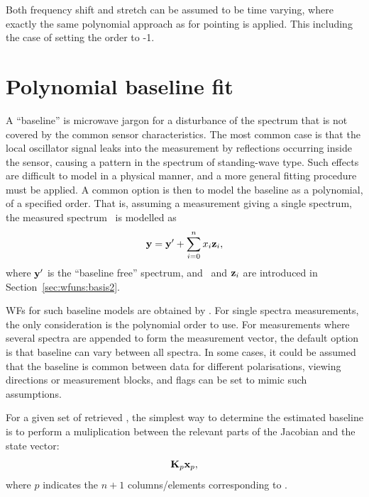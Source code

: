 Both frequency shift and stretch can be assumed to be time varying, where
exactly the same polynomial approach as for pointing is applied. This
including the case of setting the order to -1.




\section{Polynomial baseline fit}
\label{sec:wfuns:polyfit}

A ``baseline'' is microwave jargon for a disturbance of the spectrum that is
not covered by the common sensor characteristics. The most common case is that
the local oscillator signal leaks into the measurement by reflections occurring
inside the sensor, causing a pattern in the spectrum of standing-wave type.
Such effects are difficult to model in a physical manner, and a more general
fitting procedure must be applied. A common option is then to model the
baseline as a polynomial, of a specified order. That is, assuming a measurement
giving a single spectrum, the measured spectrum \MsrVct\ is modelled as
\begin{equation}
  \label{eq:polyfit}
  \mathbf{y} = \mathbf{y}' + \sum_{i=0}^n x_{i}\mathbf{z}_i,
\end{equation}
where $\mathbf{y}'$ is the ``baseline free'' spectrum, and \ and
$\mathbf{z}_i$ are introduced in Section~\ref{sec:wfuns:basis2}.

WFs for such baseline models are obtained by . For
single spectra measurements, the only consideration is the polynomial order to
use. For measurements where several spectra are appended to form the measurement
vector, the default option is that baseline can vary between all spectra. In
some cases, it could be assumed that the baseline is common between data for
different polarisations, viewing directions or measurement blocks, and flags
can be set to mimic such assumptions.

For a given set of retrieved , the simplest way to determine the
estimated baseline is to perform a muliplication between the relevant parts of
the Jacobian and the state vector:
\begin{equation}
  \mathbf{K}_{p}\mathbf{x}_{p},
  \label{eq:bline:recreate}
\end{equation}
where $p$ indicates the $n+1$ columns/elements corresponding to .


